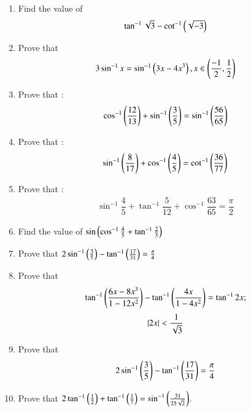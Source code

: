 \begin{enumerate}[label=\thesubsection.\arabic*.,ref=\thesubsection.\theenumi]
			\hfill{}
\item Find the value of
	\begin{align*}
		\tan^{-1}\sqrt{3}-\cot^{-1}\left(\sqrt{-3}\right)
	\end{align*}
 \hfill{}\item Prove that 
			\begin{align*}
		3\sin^{-1}x=\sin^{-1}\left(3x-4x^3\right), x\in\left(\frac{-1}{2},\frac{1}{2}\right)
			\end{align*} 

\hfill{}\item Prove that :
	\begin{align*}
		\cos^{-1}\left(\frac{12}{13}\right)+\sin^{-1}\left(\frac{3}{5}\right)=\sin^{-1} \left(\frac{56}{65}\right)
	\end{align*}
 \hfill{}\item Prove that :
         \begin{align}
          \sin^{-1}\left(\dfrac{8}{17}\right)+\cos^{-1}\left(\dfrac{4}{5}\right)=\cot^{-1}\left(\dfrac{36}{77}\right)
         \end{align}

\hfill{}\item Prove that :
    \begin{align*}
       \sin^{-1}\dfrac{4}{5}+\tan^{-1}\dfrac{5}{12}+\cos^{-1}\dfrac{63}{65}=\dfrac{\pi}{2}
    \end{align*}

\hfill{}
\item Find the value of $\sin\left(\cos^{-1}{\frac{4}{5}}+{\tan^{-1}{\frac{2}{3}}}\right)$
\hfill{}
\item Prove that $ 2\sin^{-1} \left(\frac{3}{5}\right) - \tan^{-1} \left(\frac{17}{31}\right) = \frac{\pi}{4}$

	\hfill{}
\item Prove that 
	\begin{align*}
	\tan^{-1} \left(\frac{6x-8x^{3}}{1-12x^{2}}\right) - \tan^{-1} \left(\frac{4x}{1-4x^{2}}\right) = \tan^{-1}2x;
	\end{align*}
	\begin{align*}
		\left\vert2x\right\vert < \frac{1}{\sqrt{3}}
	\end{align*}

 	\hfill{}\item Prove that 
	\begin{align*}
		2\sin^{-1}\left(\frac{3}{5}\right)-\tan^{-1}\left(\frac{17}{31}\right) = \frac{\pi}{4}
	\end{align*}
	\hfill{}
\item Prove that $2\tan^{-1}\left(\frac{1}{2}\right)+\tan^{-1}\left(\frac{1}{7}\right) = \sin^{-1}\left(\frac{31}{25\sqrt{2}}\right)$. 


\end{enumerate}
